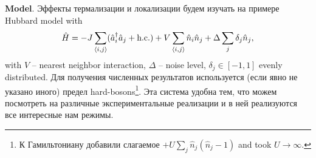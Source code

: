 
\textbf{Model}. Эффекты термализации и локализации будем изучать на примере Hubbard model with 
\begin{equation*}
	\hat{H} = 
	- J \sum_{\langle i,j\rangle} (\hat{a}_i^{\dag} \hat{a}_j + \textnormal{h.c.}) 
	+ V \sum_{\langle i,j\rangle} \hat{n}_i \hat{n}_j
	+ \Delta \sum_j \delta_j \hat{n}_j,
\end{equation*}
with $V$ -- nearest neighbor interaction, $\Delta$ -- noise level, $\delta_j \in [-1,1]$ evenly distributed. Для получения численных результатов используется (если явно не указано иного) предел hard-bosons\footnote{
	К Гамильтониану добавили слагаемое $+ U \sum_j \hat{n}_j (\hat{n}_j-1)$ and took $U \to \infty$. 
}.  Эта система удобна тем, что можем посмотреть на различные экспериментальные реализации и в ней реализуются все интересные нам режимы.